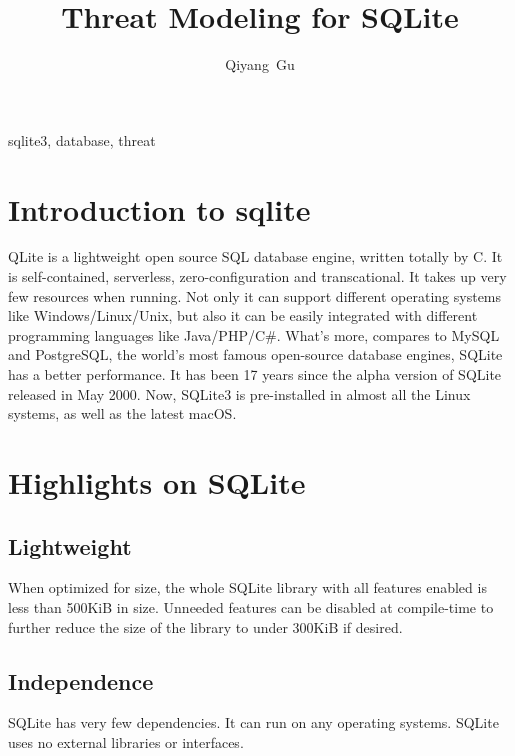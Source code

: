 \documentclass[journal]{IEEEtran}
\begin{document}
\title{Threat Modeling for SQLite}
\author{Qiyang~Gu}
\maketitle


\begin{abstract}
\blindtext
\end{abstract}

\begin{IEEEkeywords}
sqlite3, database, threat
\end{IEEEkeywords}


\section{Introduction to sqlite}
QLite is a lightweight open source SQL database engine, written totally by C.  It is self-contained, serverless, zero-configuration and transcational. It takes up very few resources when running.  Not only it can support different operating systems like Windows/Linux/Unix, but also it can be easily integrated with different programming languages like Java/PHP/C\#. What's more, compares to MySQL and PostgreSQL, the world's most famous open-source database engines, SQLite has a better performance. It has been 17 years since the alpha version of SQLite released in May 2000. Now, SQLite3 is pre-installed in almost all the Linux systems, as well as the latest macOS.


        
\section{Highlights on SQLite}

\subsection{Lightweight}
When optimized for size, the whole SQLite library with all features enabled is less than 500KiB in size. Unneeded features can be disabled at compile-time to further reduce the size of the library to under 300KiB if desired.

\subsection{Independence}
SQLite has very few dependencies. It can run on any operating systems. SQLite uses no external libraries or interfaces.
\end{document}
